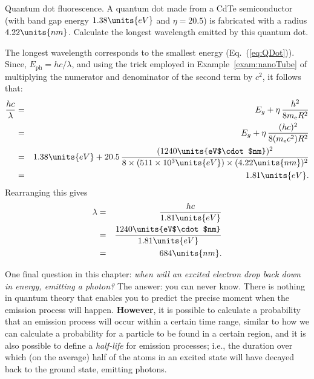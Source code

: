 \begin{example}{Quantum dot fluorescence.}
A quantum dot made from a CdTe semiconductor (with band gap energy
$1.38\units{eV}$  and $\eta = 20.5$) is fabricated with a radius 
$4.22\units{nm}$.  Calculate the longest wavelength emitted
by this quantum dot.

\begin{solution}
The longest wavelength corresponds to the smallest
energy (Eq.~(\ref{eq:QDot})). 
Since, $E_\text{ph} = hc/\lambda$, and using the trick employed in
Example~\ref{exam:nanoTube} of multiplying the numerator and 
denominator of the second term  by $c^2$,  it follows that:
\begin{eqnarray}
\frac{hc}{\lambda} &=& E_g+\eta\,  \frac{h^2}{8m_\text{e}R^2} \nonumber \\
              &=& E_g + \eta\, \frac{(hc)^2}{8(m_\text{e}c^2) R^2} \nonumber \\
              &=& 1.38\units{eV} + 20.5\,  \frac{(1240\units{eV$\cdot$nm})^2}
                {8 \times (511\times 10^3\units{eV})\times (4.22\units{nm})^2} 
                   \nonumber \\
              &=& 1.81\units{eV}. 
\end{eqnarray}
Rearranging this gives
\begin{eqnarray}
\lambda &=& \frac{hc}{1.81\units{eV}} \nonumber \\
        &=& \frac{1240\units{eV$\cdot$nm}}{1.81\units{eV}}\nonumber \\
        &=& 684\units{nm}.
\end{eqnarray}
\end{solution}
\end{example}

One final question in this chapter: {\it when will an excited electron
drop back down in energy, emitting a photon?} The answer: you can never
know. There is nothing in quantum theory that enables you to
predict the precise moment when the emission process will happen. {\bf However},
it is possible to calculate a probability that an emission process will
occur within a certain time range, similar to how we can calculate
a probability for a particle to be found in a certain region, and it
is also possible to define a {\it half-life} for emission processes; i.e.,
the duration over which (on the average) half of the atoms in an excited
state will have decayed back to the ground state, emitting photons.

